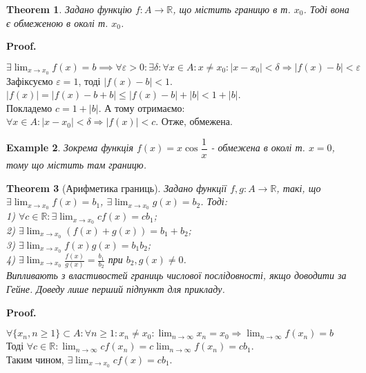\documentclass[a4paper, 14pt]{article}
\makeatletter
\def\qed{$\blacksquare$}
\theoremstyle{theoremdd}
\newtheorem{theorem}{Theorem}[subsection]
\theoremstyle{theoremdd}
\theoremstyle{theoremdd}
\theoremstyle{theoremdd}
\newtheorem{example}[theorem]{Example}
\theoremstyle{theoremdd}
\theoremstyle{theoremdd}
\theoremstyle{theoremdd}
\theoremstyle{theoremdd}
\renewenvironment{proof}[1][Proof.\\]{\par
\pushQED{\hfill \qed}%
\normalfont \topsep6\p@\@plus6\p@\relax
\trivlist
\item\relax
{\bfseries
#1\@addpunct{.}}\hspace\labelsep\ignorespaces
}{%
\popQED\endtrivlist\@endpefalse
}
\makeatother
\begin{document}
	\begin{theorem} Задано функцію $f: A \to \mathbb{R}$, що містить границю в т. $x_0$. Тоді вона є обмеженою в околі т. $x_0$.
	\end{theorem}
	
	\begin{proof}
	$\exists \displaystyle \lim_{x \to x_0} f(x) = b \implies \forall \varepsilon > 0: \exists \delta: \forall x \in A: x \neq x_0: |x-x_0|<\delta \Rightarrow |f(x)-b|<\varepsilon$\\
	Зафіксуємо $\varepsilon = 1$, тоді $|f(x) -b| < 1$.\\
	$|f(x)| = |f(x) - b + b| \leq |f(x) - b| + |b| < 1 + |b|$.\\
	Покладемо $c = 1 + |b|$. А тому отримаємо:\\
	$\forall x \in A: |x-x_0| < \delta \Rightarrow |f(x)| < c$. Отже, обмежена.
	\end{proof}
	
	\begin{example}
	Зокрема функція $f(x) = x \cos \dfrac{1}{x}$ - обмежена в околі т. $x = 0$, тому що містить там границю.
	\end{example}
	
	\begin{theorem}[Арифметика границь]
	Задано функції $f,g: A \to \mathbb{R}$, такі, що $\exists \displaystyle \lim_{x \to x_0} f(x) = b_1$, $\exists \displaystyle \lim_{x \to x_0} g(x) = b_2$. Тоді:\\
	1) $\forall c \in \mathbb{R}: \exists \displaystyle \lim_{x \to x_0} cf(x) = c b_1$;\\
	2) $\exists \displaystyle \lim_{x \to x_0} (f(x)+g(x)) = b_1 + b_2$;\\
	3) $\exists \displaystyle \lim_{x \to x_0} f(x)g(x) = b_1 b_2$;\\
	4) $\exists \displaystyle \lim_{x \to x_0} \frac{f(x)}{g(x)} = \frac{b_1}{b_2}$ при $b_2, g(x) \neq 0$.\\
	\textit{Випливають з властивостей границь числової послідовності, якщо доводити за Гейне. Доведу лише перший підпункт для прикладу.}
	\end{theorem}
	
	\begin{proof}
	$\forall \{x_n, n \geq 1\} \subset A: \forall n \geq 1: x_n \neq x_0: \displaystyle \lim_{n \to \infty} x_n = x_0 \Rightarrow \lim_{n \to \infty} f(x_n) = b$\\
	Тоді $\displaystyle \forall c \in \mathbb{R}: \lim_{n \to \infty} c f(x_n) = c \lim_{n \to \infty} f(x_n) = c b_1$.\\
	Таким чином, $\exists \displaystyle \lim_{x \to x_0} cf(x) = c b_1$.
	\end{proof}
	
\end{document}
